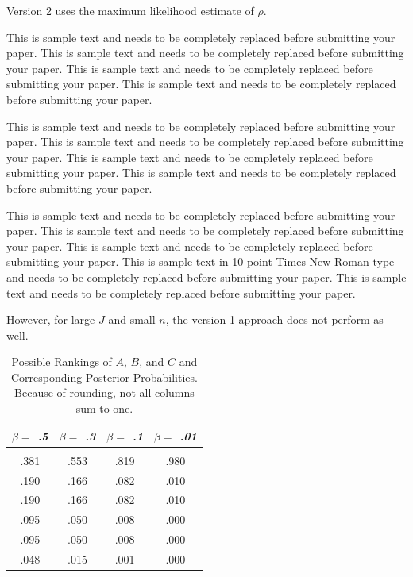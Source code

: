 \documentclass[]{asaproc}
\begin{document}
Version 2 uses the maximum likelihood estimate of \(\rho\).

This is sample text and needs to be completely replaced before
submitting your paper. This is sample text and needs to be completely
replaced before submitting your paper. This is sample text and needs to
be completely replaced before submitting your paper. This is sample text
and needs to be completely replaced before submitting your paper.

This is sample text and needs to be completely replaced before
submitting your paper. This is sample text and needs to be completely
replaced before submitting your paper. This is sample text and needs to
be completely replaced before submitting your paper. This is sample text
and needs to be completely replaced before submitting your paper.

This is sample text and needs to be completely replaced before
submitting your paper. This is sample text and needs to be completely
replaced before submitting your paper. This is sample text and needs to
be completely replaced before submitting your paper. This is sample text
in 10-point Times New Roman type and needs to be completely replaced
before submitting your paper. This is sample text and needs to be
completely replaced before submitting your paper.

However, for large \(J\) and small \(n\), the version 1 approach does
not perform as well.

\begin{table}[b]
\caption{\enspace Possible Rankings of $A$, $B$, and $C$ and Corresponding 
Posterior Probabilities.  Because of rounding, not all columns sum to 
one.}\label{tab2}
\begin{tabular*}{\hsize}{@{\extracolsep{\fill}}cccc}
\\[-5pt]
\multicolumn{1}{c}{\it $\beta =$ .5} & 
\multicolumn{1}{c}{\it $\beta =$ .3} & 
\multicolumn{1}{c}{\it $\beta =$ .1} & 
\multicolumn{1}{c}{\it $\beta =$ .01}\\
\hline
\\[-5pt]
.381 & .553 & .819 & .980 \\ 
        .190 & .166 & .082 & .010 \\
        .190 & .166 & .082 & .010 \\
        .095 & .050 & .008 & .000 \\
         .095 &  .050 &  .008 &  .000 \\
         .048 &  .015 &  .001 &   .000 \\
\hline
\end{tabular*}
\end{table}
\end{document}
